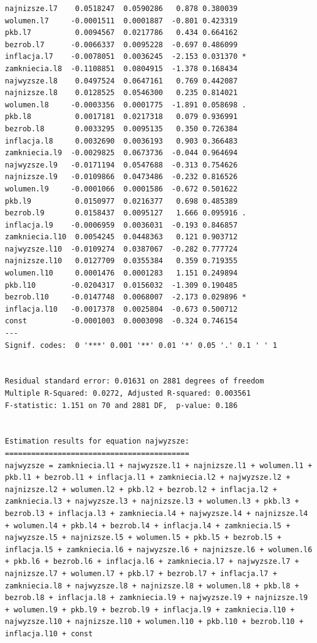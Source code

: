 \documentclass[
  polish,
  letterpaper,
  DIV=11,
  numbers=noendperiod]{scrartcl}
\begin{document}
\begin{verbatim}
najnizsze.l7    0.0518247  0.0590286   0.878 0.380039    
wolumen.l7     -0.0001511  0.0001887  -0.801 0.423319    
pkb.l7          0.0094567  0.0217786   0.434 0.664162    
bezrob.l7      -0.0066337  0.0095228  -0.697 0.486099    
inflacja.l7    -0.0078051  0.0036245  -2.153 0.031370 *  
zamkniecia.l8  -0.1108851  0.0804915  -1.378 0.168434    
najwyzsze.l8    0.0497524  0.0647161   0.769 0.442087    
najnizsze.l8    0.0128525  0.0546300   0.235 0.814021    
wolumen.l8     -0.0003356  0.0001775  -1.891 0.058698 .  
pkb.l8          0.0017181  0.0217318   0.079 0.936991    
bezrob.l8       0.0033295  0.0095135   0.350 0.726384    
inflacja.l8     0.0032690  0.0036193   0.903 0.366483    
zamkniecia.l9  -0.0029825  0.0673736  -0.044 0.964694    
najwyzsze.l9   -0.0171194  0.0547688  -0.313 0.754626    
najnizsze.l9   -0.0109866  0.0473486  -0.232 0.816526    
wolumen.l9     -0.0001066  0.0001586  -0.672 0.501622    
pkb.l9          0.0150977  0.0216377   0.698 0.485389    
bezrob.l9       0.0158437  0.0095127   1.666 0.095916 .  
inflacja.l9    -0.0006959  0.0036031  -0.193 0.846857    
zamkniecia.l10  0.0054245  0.0448363   0.121 0.903712    
najwyzsze.l10  -0.0109274  0.0387067  -0.282 0.777724    
najnizsze.l10   0.0127709  0.0355384   0.359 0.719355    
wolumen.l10     0.0001476  0.0001283   1.151 0.249894    
pkb.l10        -0.0204317  0.0156032  -1.309 0.190485    
bezrob.l10     -0.0147748  0.0068007  -2.173 0.029896 *  
inflacja.l10   -0.0017378  0.0025804  -0.673 0.500712    
const          -0.0001003  0.0003098  -0.324 0.746154    
---
Signif. codes:  0 '***' 0.001 '**' 0.01 '*' 0.05 '.' 0.1 ' ' 1


Residual standard error: 0.01631 on 2881 degrees of freedom
Multiple R-Squared: 0.0272, Adjusted R-squared: 0.003561 
F-statistic: 1.151 on 70 and 2881 DF,  p-value: 0.186 


Estimation results for equation najwyzsze: 
========================================== 
najwyzsze = zamkniecia.l1 + najwyzsze.l1 + najnizsze.l1 + wolumen.l1 + pkb.l1 + bezrob.l1 + inflacja.l1 + zamkniecia.l2 + najwyzsze.l2 + najnizsze.l2 + wolumen.l2 + pkb.l2 + bezrob.l2 + inflacja.l2 + zamkniecia.l3 + najwyzsze.l3 + najnizsze.l3 + wolumen.l3 + pkb.l3 + bezrob.l3 + inflacja.l3 + zamkniecia.l4 + najwyzsze.l4 + najnizsze.l4 + wolumen.l4 + pkb.l4 + bezrob.l4 + inflacja.l4 + zamkniecia.l5 + najwyzsze.l5 + najnizsze.l5 + wolumen.l5 + pkb.l5 + bezrob.l5 + inflacja.l5 + zamkniecia.l6 + najwyzsze.l6 + najnizsze.l6 + wolumen.l6 + pkb.l6 + bezrob.l6 + inflacja.l6 + zamkniecia.l7 + najwyzsze.l7 + najnizsze.l7 + wolumen.l7 + pkb.l7 + bezrob.l7 + inflacja.l7 + zamkniecia.l8 + najwyzsze.l8 + najnizsze.l8 + wolumen.l8 + pkb.l8 + bezrob.l8 + inflacja.l8 + zamkniecia.l9 + najwyzsze.l9 + najnizsze.l9 + wolumen.l9 + pkb.l9 + bezrob.l9 + inflacja.l9 + zamkniecia.l10 + najwyzsze.l10 + najnizsze.l10 + wolumen.l10 + pkb.l10 + bezrob.l10 + inflacja.l10 + const 


\end{verbatim}
\end{document}
